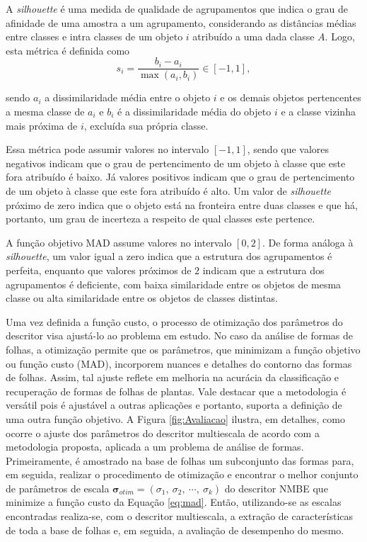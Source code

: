 A \textit{silhouette }\cite{Rousseeuw:1987} é uma medida de qualidade de agrupamentos que indica o grau de afinidade de uma amostra  a um agrupamento, considerando as distâncias médias entre classes e intra classes de um objeto $i$ atribuído a uma dada classe $A$. Logo, esta métrica é definida como 
\begin{equation}
s_i = \frac{b_i - a_i}{\max{(a_i,b_i)}} \in [-1,1],
\end{equation}

\noindent sendo $a_i$ a dissimilaridade média entre o objeto $i$ e os demais objetos pertencentes a mesma classe de $a_i$ e $b_i$ é a dissimilaridade média do objeto $i$ e a classe vizinha mais próxima de $i$, excluída sua própria classe. 

Essa métrica pode assumir valores no intervalo $[-1,1]$, sendo que valores negativos indicam que o grau de pertencimento de um objeto à classe que este fora atribuído é baixo. Já valores positivos indicam que o grau de pertencimento de um objeto à classe que este fora atribuído é alto. Um valor de \textit{silhouette} próximo de zero indica que o objeto está na fronteira entre duas classes e que há, portanto, um grau de incerteza a respeito de qual classes este pertence.

A função objetivo \ac{MAD} assume valores no intervalo $[0,2]$. De forma análoga à \textit{silhouette}, um valor igual a zero indica que a estrutura dos agrupamentos é perfeita, enquanto que valores próximos de $2$ indicam que a estrutura dos agrupamentos é deficiente, com baixa similaridade entre os objetos de mesma classe ou alta similaridade entre os objetos de classes distintas.

Uma vez definida a função custo, o processo de otimização dos parâmetros do descritor visa ajustá-lo ao problema em estudo. No caso da análise de formas de folhas, a otimização permite que os parâmetros, que minimizam a função objetivo ou função custo (\ac{MAD}), incorporem nuances e detalhes do contorno das formas de folhas. Assim, tal ajuste reflete em melhoria na acurácia da classificação e recuperação de formas de folhas de plantas. Vale destacar que a metodologia é versátil pois é ajustável a outras aplicações e portanto, suporta a definição de uma outra função objetivo. A Figura  \ref{fig:Avaliacao} ilustra, em detalhes, como ocorre o ajuste dos parâmetros do descritor multiescala de acordo com a metodologia proposta, aplicada a um problema de análise de formas. Primeiramente, é amostrado na base de folhas um subconjunto das formas para, em seguida, realizar o procedimento de otimização e encontrar o melhor conjunto de parâmetros de escala  $\boldsymbol{\sigma}_{otim} = (\sigma_1,\:\sigma_2,\:\cdots,\:\sigma_k)$ do descritor \ac{NMBE} que minimize a função custo da Equação \ref{eq:mad}. Então, utilizando-se as escalas encontradas realiza-se, com o descritor multiescala, a extração de características de toda a base de folhas e, em seguida, a avaliação de desempenho do mesmo.

